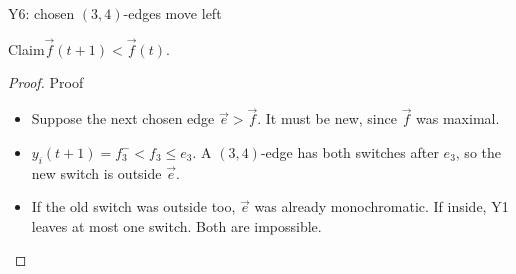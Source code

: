 \begin{frame}[t]{Y6: chosen $(3,4)$-edges move left}
  \small{}
  \claimreminder{\Yone\Ymovenotation}
  \begin{lemma}{Claim}$\vec f(t+1)<\vec f(t)$.\end{lemma}
  \begin{proof}{Proof}
    \begin{itemize}
      \item<1-> Suppose the next chosen edge $\vec e>\vec f$. It must be new, since $\vec f$ was maximal.
      \item<2-> $y_i(t+1)=f_3^-<f_3\leq e_3$. A $(3,4)$-edge has both switches after $e_3$, so the new switch is outside $\vec e$.
      \item<3-> If the old switch was outside too, $\vec e$ was already monochromatic. If inside, Y1 leaves at most one switch. Both are impossible.
    \end{itemize}
  \end{proof}
\end{frame}

